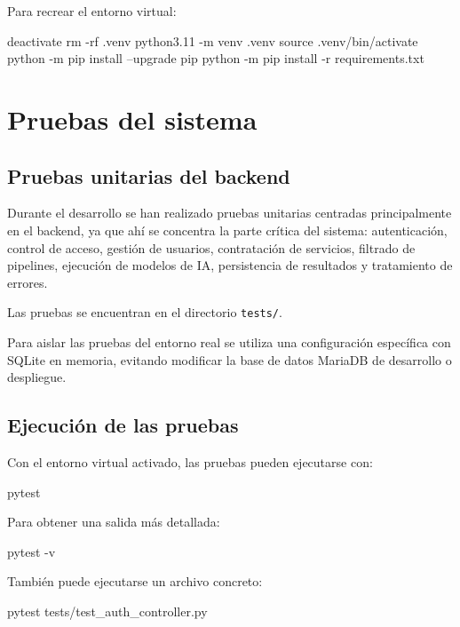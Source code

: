 Para recrear el entorno virtual:

\begin{bloqueTerminal}[title={Recreación del entorno virtual}]
	deactivate
	rm -rf .venv
	python3.11 -m venv .venv
	source .venv/bin/activate
	python -m pip install --upgrade pip
	python -m pip install -r requirements.txt
\end{bloqueTerminal}

\section{Pruebas del sistema}

\subsection{Pruebas unitarias del backend}

Durante el desarrollo se han realizado pruebas unitarias centradas principalmente en el backend, ya que ahí se concentra la parte crítica del sistema: autenticación, control de acceso, gestión de usuarios, contratación de servicios, filtrado de pipelines, ejecución de modelos de IA, persistencia de resultados y tratamiento de errores.

Las pruebas se encuentran en el directorio \texttt{tests/}.

Para aislar las pruebas del entorno real se utiliza una configuración específica con SQLite en memoria, evitando modificar la base de datos MariaDB de desarrollo o despliegue.

\subsection{Ejecución de las pruebas}

Con el entorno virtual activado, las pruebas pueden ejecutarse con:

\begin{bloqueTerminal}[title={Ejecución de todas las pruebas}]
	pytest
\end{bloqueTerminal}

Para obtener una salida más detallada:

\begin{bloqueTerminal}[title={Ejecución detallada}]
	pytest -v
\end{bloqueTerminal}

También puede ejecutarse un archivo concreto:

\begin{bloqueTerminal}[title={Ejecución de un archivo de pruebas}]
	pytest tests/test_auth_controller.py
\end{bloqueTerminal}

